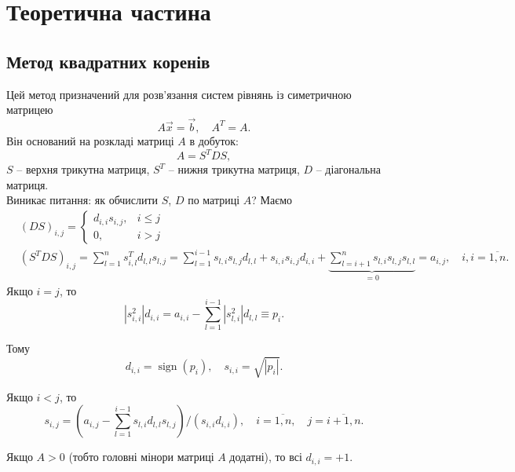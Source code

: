 \documentclass[12pt, a4paper]{article}
\theoremstyle{definition}
\newcommand{\Sum}{\displaystyle\sum\limits}
\DeclareMathOperator{\signum}{sign}
\numberwithin{equation}{section}
\begin{document}
\section{Теоретична частина}

\subsection{Метод квадратних коренів}
Цей метод призначений для розв'язання систем рівнянь із симетричною матрицею
\begin{equation}
	\label{eq:3.6}
	A \vec x = \vec b, \quad A^T = A.
\end{equation}
Він оснований на розкладі матриці $A$ в добуток:
\begin{equation}
	\label{eq:3.7}
	A = S^T D S,
\end{equation}
$S$ -- верхня трикутна матриця, $S^T$ -- нижня трикутна матриця, $D$ -- діагональна матриця. \\

Виникає питання: як обчислити $S$, $D$ по матриці $A$? Маємо
\begin{equation}
	\label{eq:3.8}
	\begin{aligned}
		& (DS)_{i,j} = \begin{cases} d_{i,i}s_{i,j}, & i \le j \\ 0, & i > j \end{cases} \\
		& (S^TDS)_{i,j} = \Sum_{l=1}^n s_{i,l}^T d_{l,l} s_{l, j} = \Sum_{l=1}^{i-1} s_{l,i} s_{l, j} d_{l, l} + s_{i,i} s_{i,j} d_{i,i} + \underset{=0}{\underbrace{\Sum_{l=i+1}^n s_{l, i} s_{l, j} s_{l,l}}} = a_{i,j}, \quad i,i = \overline{1,n}. 
	\end{aligned}
\end{equation}
Якщо $i = j$, то \[ |s_{i,i}^2|d_{i,i} = a_{i,i} - \Sum_{l=1}^{i-1} |s_{l,i}^2| d_{l,l} \equiv p_i.\]

Тому \[ d_{i,i} = \signum (p_i), \quad s_{i,i} = \sqrt{|p_i|}. \]

Якщо $i < j$, то \[ s_{i,j} = \left( a_{i,j} - \Sum_{l=1}^{i-1} s_{l,i} d_{l,l} s_{l,j} \right) / (s_{i,i} d_{i,i}), \quad i = \overline{1, n}, \quad j = \overline{i+1, n}. \]

Якщо $A > 0$ (тобто головні мінори матриці $A$ додатні), то всі $d_{i,i} = +1$. \\
\end{document}
